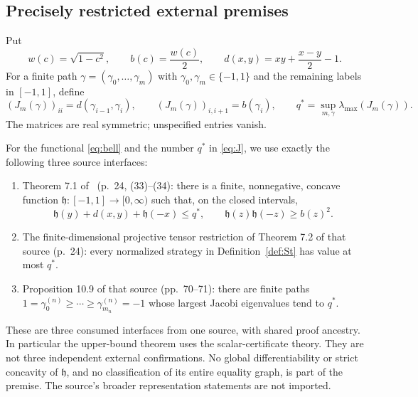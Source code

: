 \subsection{Precisely restricted external premises}
Put
\begin{equation}\label{eq:coefficients}
 w(c)=\sqrt{1-c^2},\qquad b(c)=\frac{w(c)}2,\qquad
 d(x,y)=xy+\frac{x-y}{2}-1.
\end{equation}
For a finite path \(\gamma=(\gamma_0,\ldots,\gamma_m)\) with
\(\gamma_0,\gamma_m\in\{-1,1\}\) and the remaining labels in
\([-1,1]\), define
\begin{equation}\label{eq:J}
 (J_m(\gamma))_{ii}=d(\gamma_{i-1},\gamma_i),\qquad
 (J_m(\gamma))_{i,i+1}=b(\gamma_i),
 \qquad q^*=\sup_{m,\gamma}\lambda_{\max}(J_m(\gamma)).
\end{equation}
The matrices are real symmetric; unspecified entries vanish.

\begin{premise}[Coladangelo v1]\label{prem:Coladangelo}
For the functional \eqref{eq:bell} and the number \(q^*\) in
\eqref{eq:J}, we use exactly the following three source interfaces:
\begin{enumerate}
\item Theorem 7.1 of~\cite{Coladangelo2026v1} (p.~24, (33)--(34):
there is a finite, nonnegative, concave function
\(\mathfrak h:[-1,1]\to[0,\infty)\) such that, on the closed intervals,
\begin{equation}\label{eq:storage}
 \mathfrak h(y)+d(x,y)+\mathfrak h(-x)\le q^*,\qquad
 \mathfrak h(z)\mathfrak h(-z)\ge b(z)^2.
\end{equation}
\item The finite-dimensional projective tensor restriction of Theorem 7.2
of that source (p.~24): every normalized strategy in
Definition~\ref{def:St} has value at most \(q^*\).
\item Proposition 10.9 of that source (pp.~70--71): there are finite paths
\(1=\gamma^{(n)}_0\ge\cdots\ge\gamma^{(n)}_{m_n}=-1\)
whose largest Jacobi eigenvalues tend to \(q^*\).
\end{enumerate}
\end{premise}
These are three consumed interfaces from one source, with shared proof
ancestry. In particular the upper-bound theorem uses the scalar-certificate
theory. They are not three independent external confirmations. No global
differentiability or strict concavity of \(\mathfrak h\), and no classification of its
entire equality graph, is part of the premise. The source's broader
representation statements are not imported.

